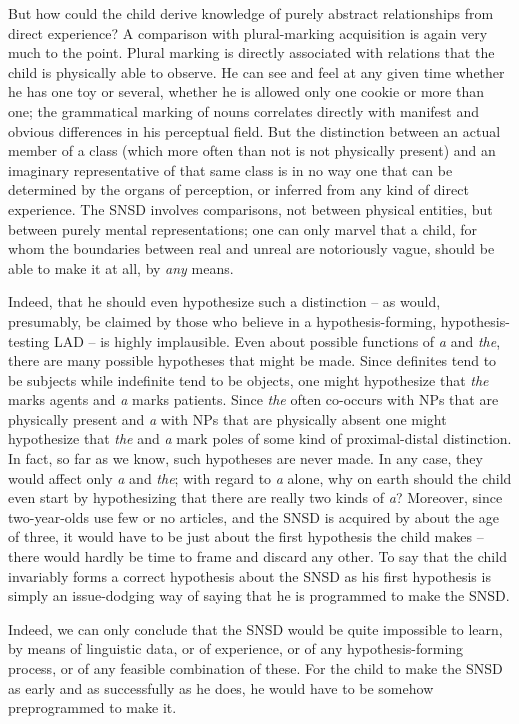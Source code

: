 But how could the child derive knowledge of purely abstract relationships from direct experience? A comparison with plural-marking acquisition is again very much to the point. Plural marking is directly associated with relations that the child is physically able to observe. He can see and feel at any given time whether he has one toy or several, whether he is allowed only one cookie or more than one; the grammatical marking of nouns correlates directly with manifest and obvious differences in his perceptual field. But the distinction between an actual member of a class (which more often than not is not physically present) and an imaginary representative of that same class is in no way one that can be determined by the organs of perception, or inferred from any kind of direct experience. The SNSD involves comparisons, not between physical entities, but between purely mental representations; one can only marvel that a child, for whom the boundaries between real and unreal are notoriously vague, should be able to make it at all, by \textit{any} means.

Indeed, that he should even hypothesize such a distinction -- as would, presumably, be claimed by those who believe in a hypothesis-forming, hypothesis-testing LAD -- is highly implausible. Even about possible functions of \textit{a} and \textit{the}, there are many possible hypotheses that might be made. Since definites tend to be subjects while indefinite tend to be objects, one might hypothesize that \textit{the} marks agents and
\textit{a} marks patients. Since \textit{the} often co-occurs with NPs that are physically present and \textit{a} with NPs that are physically absent one might hypothesize that \textit{the} and \textit{a} mark poles of some kind of proximal-distal distinction. In fact, so far as we know, such hypotheses are never made. In any case, they would affect only \textit{a} and \textit{the}; with regard to \textit{a} alone, why on earth should the child even start by hypothesizing that there are really two kinds of \textit{a}? Moreover, since two-year-olds use few or no articles, and the SNSD is acquired by about the age of three, it would have to be just about the first hypothesis the child makes -- there would hardly be time to frame and discard any other. To say that the child invariably forms a correct hypothesis about the SNSD as his first hypothesis is simply an issue-dodging way of saying that he is programmed to make the SNSD.

Indeed, we can only conclude that the SNSD would be quite impossible to learn, by means of linguistic data, or of experience, or of any hypothesis-forming process, or of any feasible combination of these. For the child to make the SNSD as early and as successfully as he does, he would have to be somehow preprogrammed to make it.

